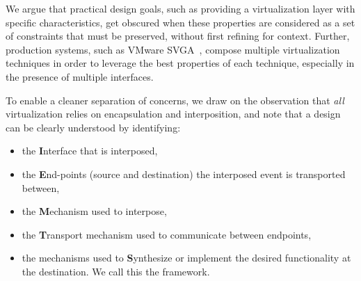 We argue that practical design goals, such as providing a virtualization layer
with specific characteristics, get obscured when these properties are
considered as a set of constraints that must be preserved, without first
refining for context.
Further, production systems, such as VMware SVGA~\cite{dowty2009gpu},
compose multiple virtualization techniques in order to leverage the best
properties of each technique, especially in the presence of multiple
interfaces.

To enable a cleaner separation of concerns, we draw on the observation that
\textit{all} virtualization relies on encapsulation and interposition, and
note that a design can be clearly understood by identifying:
\begin{itemize}[nosep, topsep=0em, leftmargin=1em,labelwidth=*,align=left]
\item the \textbf{I}nterface that is interposed,
\item the \textbf{E}nd-points (source and destination) the interposed event is
transported between,
\item the \textbf{M}echanism used to interpose,
\item the \textbf{T}ransport mechanism used to communicate between endpoints,
\item the mechanisms used to \textbf{S}ynthesize or implement the desired
functionality at the destination. We call this the \textbf{\iemts} framework.
\end{itemize}

\begin{table}[tt!]
\centering
\footnotesize
{}
\caption{Comparing virtualization designs using the \texttt{IEMTS} framework.}
\label{tab:new-dims}
\end{table}

